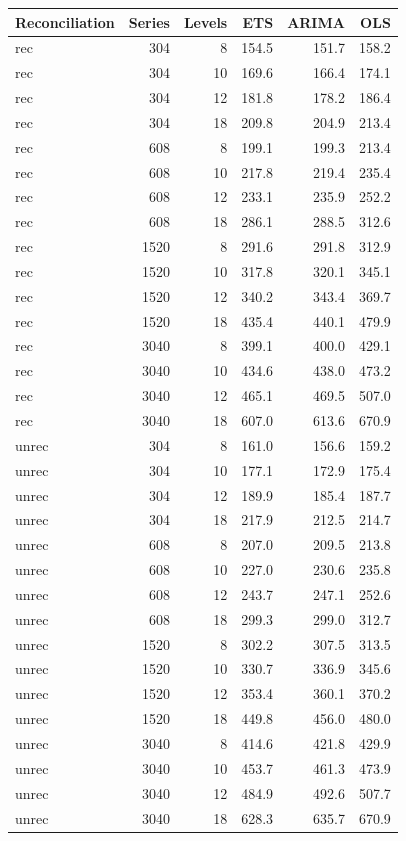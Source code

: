 \documentclass[11pt,a4paper,]{article}
\let\origtable\table
\let\endorigtable\endtable
\renewenvironment{table}[1][2] {
    \expandafter\origtable\expandafter[!htbp]
} {
    \endorigtable
}
\begin{document}
\begin{table}[!h]

\caption{\label{tab:TourismdatasimfixlevelNS}Mean RMSE by number of hierarchy levels, number of bottom-level series, method, with/without reconciliation. Simulated series has error value 0.5. Forecasting uses fixed origin for a 24-month horizon.}
\centering
\begin{tabular}[t]{lrrrrr}
\toprule
Reconciliation & Series & Levels & ETS & ARIMA & OLS\\
\midrule
rec & 304 & 8 & 154.5 & 151.7 & 158.2\\
rec & 304 & 10 & 169.6 & 166.4 & 174.1\\
rec & 304 & 12 & 181.8 & 178.2 & 186.4\\
rec & 304 & 18 & 209.8 & 204.9 & 213.4\\
rec & 608 & 8 & 199.1 & 199.3 & 213.4\\
rec & 608 & 10 & 217.8 & 219.4 & 235.4\\
rec & 608 & 12 & 233.1 & 235.9 & 252.2\\
rec & 608 & 18 & 286.1 & 288.5 & 312.6\\
rec & 1520 & 8 & 291.6 & 291.8 & 312.9\\
rec & 1520 & 10 & 317.8 & 320.1 & 345.1\\
rec & 1520 & 12 & 340.2 & 343.4 & 369.7\\
rec & 1520 & 18 & 435.4 & 440.1 & 479.9\\
rec & 3040 & 8 & 399.1 & 400.0 & 429.1\\
rec & 3040 & 10 & 434.6 & 438.0 & 473.2\\
rec & 3040 & 12 & 465.1 & 469.5 & 507.0\\
rec & 3040 & 18 & 607.0 & 613.6 & 670.9\\
unrec & 304 & 8 & 161.0 & 156.6 & 159.2\\
unrec & 304 & 10 & 177.1 & 172.9 & 175.4\\
unrec & 304 & 12 & 189.9 & 185.4 & 187.7\\
unrec & 304 & 18 & 217.9 & 212.5 & 214.7\\
unrec & 608 & 8 & 207.0 & 209.5 & 213.8\\
unrec & 608 & 10 & 227.0 & 230.6 & 235.8\\
unrec & 608 & 12 & 243.7 & 247.1 & 252.6\\
unrec & 608 & 18 & 299.3 & 299.0 & 312.7\\
unrec & 1520 & 8 & 302.2 & 307.5 & 313.5\\
unrec & 1520 & 10 & 330.7 & 336.9 & 345.6\\
unrec & 1520 & 12 & 353.4 & 360.1 & 370.2\\
unrec & 1520 & 18 & 449.8 & 456.0 & 480.0\\
unrec & 3040 & 8 & 414.6 & 421.8 & 429.9\\
unrec & 3040 & 10 & 453.7 & 461.3 & 473.9\\
unrec & 3040 & 12 & 484.9 & 492.6 & 507.7\\
unrec & 3040 & 18 & 628.3 & 635.7 & 670.9\\
\bottomrule
\end{tabular}
\end{table}
\end{document}
